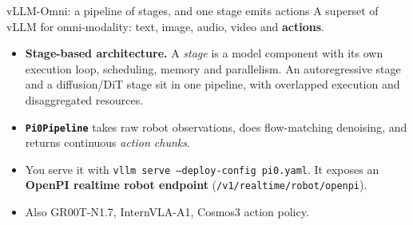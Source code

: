 \documentclass[aspectratio=169,10pt]{beamer}
\newcommand{\emphc}[1]{\textcolor{accent}{\textbf{#1}}}
\begin{document}
\begin{frame}{vLLM-Omni: a pipeline of stages, and one stage emits actions}
  A superset of vLLM for omni-modality: text, image, audio, video and
  \emphc{actions}.
  \vspace{0.6em}
  \begin{itemize}
    \item \textbf{Stage-based architecture.} A \emph{stage} is a model
          component with its own execution loop, scheduling, memory and
          parallelism. An autoregressive stage and a diffusion/DiT stage sit
          in one pipeline, with overlapped execution and disaggregated
          resources.
    \item \textbf{\texttt{Pi0Pipeline}} takes raw robot observations, does
          flow-matching denoising, and returns continuous \emph{action chunks}.
    \item You serve it with \texttt{vllm serve --deploy-config pi0.yaml}. It
          exposes an \textbf{OpenPI realtime robot endpoint}
          (\texttt{/v1/realtime/robot/openpi}).
    \item Also GR00T-N1.7, InternVLA-A1, Cosmos3 action policy.
  \end{itemize}
\end{frame}
\end{document}
